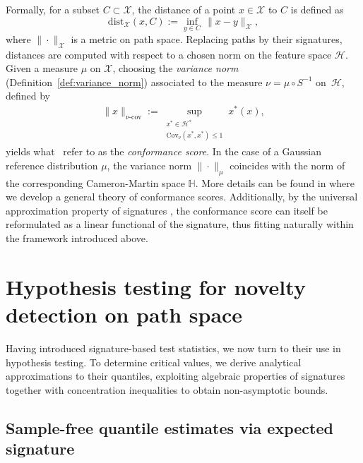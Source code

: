 \documentclass[twoside,11pt]{article}
\numberwithin{equation}{section}
\numberwithin{theorem}{section}
\newcommand{\X}{\mathcal{X}}
\newcommand{\h}{\mathcal{H}}
\newcommand{\Hh}{\mathbb{H}}
\begin{document}
Formally, for a subset \(C \subset \X\), the distance of a point \(x \in \X\) to \(C\) is defined as
\begin{equation*}
    \mathrm{dist}_{\X}(x, C) := \inf_{y \in C} \, \|x - y\|_{\X},
\end{equation*}
where $\|\cdot\|_{\X}$ is a metric on path space. Replacing paths by their signatures, distances are computed with respect to a chosen norm on the feature space $\h$. Given a measure $\mu$ on $\mathcal{X}$, choosing the \emph{variance norm} (Definition~\ref{def:variance_norm}) associated to the measure $\nu=\mu\circ S^{-1}$ on~$\h$, defined by 
\begin{align*}
\|x\|_{\nu\mbox{-}\text{cov}}:=\sup_{\substack{x^*\in \h^*\\ \mathrm{Cov}_\nu(x^*, x^*)\leq 1}} x^*(x),
\end{align*}
yields what~\citet{shao2020dimensionless} refer to as the \emph{conformance score}. In the case of a Gaussian reference distribution $\mu$, the variance norm $\|\cdot\|_{\mu}$ coincides with the norm of the corresponding Cameron-Martin space $\Hh.$ More details can be found in  where we develop a general theory of conformance scores. 
Additionally, by the universal approximation property of signatures \cite[Theorem 1.4.7]{cass2024lecture}, the conformance score can itself be reformulated as a linear functional of the signature, thus fitting naturally within the framework introduced above. 




\section{Hypothesis testing for novelty detection on path space}

Having introduced signature-based test statistics, we now turn to their use in hypothesis testing. To determine critical values, we derive analytical approximations to their quantiles, exploiting algebraic properties of signatures together with concentration inequalities to obtain non-asymptotic bounds.

\subsection{Sample-free quantile estimates via expected signature}
\end{document}

